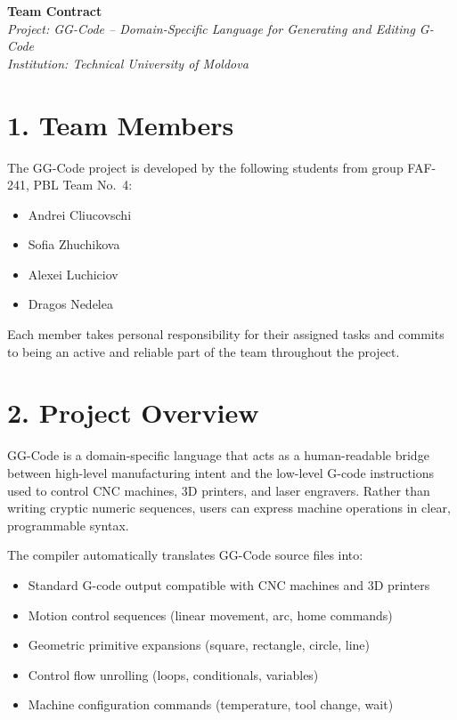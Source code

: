 \documentclass[12pt, a4paper]{article}
\begin{document}
\begin{center}
    {\Large\textbf{Team Contract}}\\[0.4em]
    \textit{Project: GG-Code -- Domain-Specific Language for Generating and Editing G-Code}\\[0.2em]
    \textit{Institution: Technical University of Moldova}
\end{center}

\vspace{1em}

\section{1. Team Members}

The GG-Code project is developed by the following students from group FAF-241, PBL Team No.~4:

\begin{itemize}[leftmargin=2em, label={--}]
    \item Andrei Cliucovschi
    \item Sofia Zhuchikova
    \item Alexei Luchiciov
    \item Dragos Nedelea
\end{itemize}

Each member takes personal responsibility for their assigned tasks and commits to being an active
and reliable part of the team throughout the project.

\section{2. Project Overview}

GG-Code is a domain-specific language that acts as a human-readable bridge between high-level
manufacturing intent and the low-level G-code instructions used to control CNC machines, 3D
printers, and laser engravers. Rather than writing cryptic numeric sequences, users can express
machine operations in clear, programmable syntax.

The compiler automatically translates GG-Code source files into:

\begin{itemize}[leftmargin=2em, label={--}]
    \item Standard G-code output compatible with CNC machines and 3D printers
    \item Motion control sequences (linear movement, arc, home commands)
    \item Geometric primitive expansions (square, rectangle, circle, line)
    \item Control flow unrolling (loops, conditionals, variables)
    \item Machine configuration commands (temperature, tool change, wait)
\end{itemize}
\end{document}
